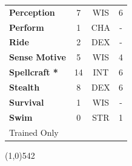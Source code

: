 \documentclass[letterpaper]{article}
\newcommand{\fullline}{\noindent\line(1,0){542} \\}
\begin{document}
\begin{table}[h!]
{{\begin{tabular}{l  c  c  c}
        \textbf{Perception} & 7 & {\footnotesize WIS} & 6 \\
        \textbf{Perform} & 1 & {\footnotesize CHA} & - \\
        \hline
        \textbf{Ride} & 2 & {\footnotesize DEX} & - \\
        \textbf{Sense Motive} & 5 & {\footnotesize WIS} & 4 \\
        \hline
        \textbf{Spellcraft *} & 14 & {\footnotesize INT} & 6 \\
        \textbf{Stealth} & 8 & {\footnotesize DEX} & 6 \\
        \hline
        \textbf{Survival} & 1 & {\footnotesize WIS} & - \\
        \textbf{Swim} & 0 & {\footnotesize STR} & 1 \\
        {\footnotesize * Trained Only} \\
        \end{tabular}
    }
}
\vspace{-1.5em}
\end{table} \par

\vspace{-1.5em}
\fullline
\vspace{-1em}
\end{document}
